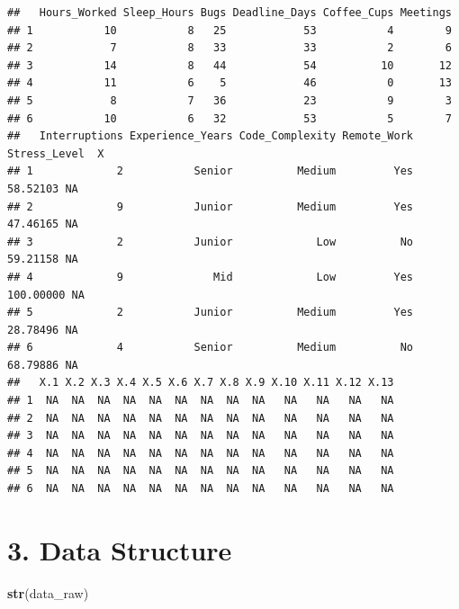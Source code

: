 \documentclass[
]{article}
\newenvironment{Shaded}{\begin{snugshade}}{\end{snugshade}}
\newcommand{\FunctionTok}[1]{\textcolor[rgb]{0.13,0.29,0.53}{\textbf{#1}}}
\newcommand{\NormalTok}[1]{#1}
\begin{document}
\begin{verbatim}
##   Hours_Worked Sleep_Hours Bugs Deadline_Days Coffee_Cups Meetings
## 1           10           8   25            53           4        9
## 2            7           8   33            33           2        6
## 3           14           8   44            54          10       12
## 4           11           6    5            46           0       13
## 5            8           7   36            23           9        3
## 6           10           6   32            53           5        7
##   Interruptions Experience_Years Code_Complexity Remote_Work Stress_Level  X
## 1             2           Senior          Medium         Yes     58.52103 NA
## 2             9           Junior          Medium         Yes     47.46165 NA
## 3             2           Junior             Low          No     59.21158 NA
## 4             9              Mid             Low         Yes    100.00000 NA
## 5             2           Junior          Medium         Yes     28.78496 NA
## 6             4           Senior          Medium          No     68.79886 NA
##   X.1 X.2 X.3 X.4 X.5 X.6 X.7 X.8 X.9 X.10 X.11 X.12 X.13
## 1  NA  NA  NA  NA  NA  NA  NA  NA  NA   NA   NA   NA   NA
## 2  NA  NA  NA  NA  NA  NA  NA  NA  NA   NA   NA   NA   NA
## 3  NA  NA  NA  NA  NA  NA  NA  NA  NA   NA   NA   NA   NA
## 4  NA  NA  NA  NA  NA  NA  NA  NA  NA   NA   NA   NA   NA
## 5  NA  NA  NA  NA  NA  NA  NA  NA  NA   NA   NA   NA   NA
## 6  NA  NA  NA  NA  NA  NA  NA  NA  NA   NA   NA   NA   NA
\end{verbatim}

\section{3. Data Structure}\label{data-structure}

\begin{Shaded}
\begin{Highlighting}[]
\FunctionTok{str}\NormalTok{(data\_raw)}
\end{Highlighting}
\end{Shaded}
\end{document}
